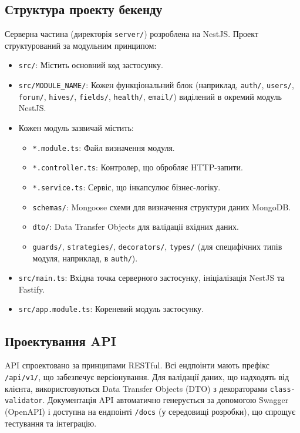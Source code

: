 \subsection{Структура проекту бекенду}
Серверна частина (директорія \texttt{server/}) розроблена на NestJS. Проект структурований за модульним принципом:
\begin{itemize}
    \item \texttt{src/}: Містить основний код застосунку.
    \item \texttt{src/MODULE\_NAME/}: Кожен функціональний блок (наприклад, \texttt{auth/}, \texttt{users/}, \texttt{forum/}, \texttt{hives/}, \texttt{fields/}, \texttt{health/}, \texttt{email/}) виділений в окремий модуль NestJS.
    \item Кожен модуль зазвичай містить:
        \begin{itemize}
            \item \texttt{*.module.ts}: Файл визначення модуля.
            \item \texttt{*.controller.ts}: Контролер, що обробляє HTTP-запити.
            \item \texttt{*.service.ts}: Сервіс, що інкапсулює бізнес-логіку.
            \item \texttt{schemas/}: Mongoose схеми для визначення структури даних MongoDB.
            \item \texttt{dto/}: Data Transfer Objects для валідації вхідних даних.
            \item \texttt{guards/}, \texttt{strategies/}, \texttt{decorators/}, \texttt{types/} (для специфічних типів модуля, наприклад, в \texttt{auth/}).
        \end{itemize}
    \item \texttt{src/main.ts}: Вхідна точка серверного застосунку, ініціалізація NestJS та Fastify.
    \item \texttt{src/app.module.ts}: Кореневий модуль застосунку.
\end{itemize}

\subsection{Проектування API}
API спроектовано за принципами RESTful. Всі ендпоінти мають префікс \texttt{/api/v1/}, що забезпечує версіонування. Для валідації даних, що надходять від клієнта, використовуються Data Transfer Objects (DTO) з декораторами \texttt{class-validator}. Документація API автоматично генерується за допомогою Swagger (OpenAPI) і доступна на ендпоінті \texttt{/docs} (у середовищі розробки), що спрощує тестування та інтеграцію.

